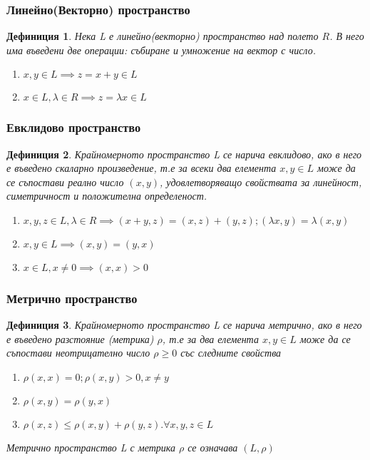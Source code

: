 \documentclass[fleqn]{article}
\newtheorem{definition}{Дефиниция}[subsection]
\begin{document}
\subsubsection{Линейно(Векторно) пространство}
	\begin{definition}
Нека L е линейно(векторно) пространство над полето $R$. В него има въведени две операции: събиране и умножение на вектор с число.
		\begin{enumerate}
 			\item $x,y \in L \implies z = x+ y \in L $
			\item $x \in L, \lambda \in R \implies z = \lambda x \in L$
		\end{enumerate}
\end{definition}

\subsubsection{Евклидово пространство}
\begin{definition}
Крайномерното пространство L се нарича евклидово, ако в него е въведено скаларно произведение, т.е за всеки два елемента $x,y \in L$ може да се съпостави реално число $(x,y)$, удовлетворяващо свойствата за линейност, симетричност и положителна определеност.
	\begin{enumerate}
 		\item $x,y,z \in L ,\lambda \in R \implies (x+y,z) = (x,z) + (y,z); (\lambda x,y) = \lambda(x,y)$
		\item $x,y \in L \implies (x,y) = (y,x)$
		\item $x \in L, x\neq 0 \implies (x,x) > 0 $
	\end{enumerate}
\end{definition}

\subsubsection{Метрично пространство}
\begin{definition}
Крайномерното пространство L се нарича метрично, ако в него е въведено разстояние (метрика) $\rho$, т.е за два елемента $x,y \in L$ може да се съпостави неотрицателно число  $\rho \geq 0 $  със следните свойства
	\begin{enumerate}
 		\item $\rho(x,x) = 0 ; \rho(x,y) > 0 , x\neq y $
		\item $\rho(x,y) = \rho(y,x)$
		\item $\rho(x,z) \leq \rho(x,y) + \rho(y,z). \forall x,y,z \in L$
	\end{enumerate}
Метрично пространство L с метрика $\rho$ се означава $(L,\rho)$
\end{definition}
\end{document}
